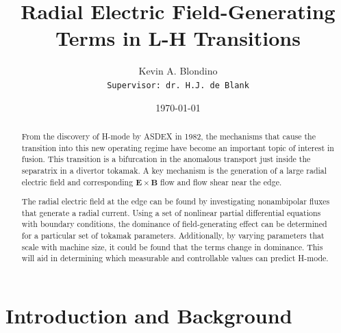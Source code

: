 \documentclass[a4paper]{article}
\author{Kevin A. Blondino \\
	\texttt{Supervisor: dr. H.J. de Blank}}
\title{Radial Electric Field-Generating Terms in L-H Transitions}
\date{\today}
\begin{document}
\maketitle


\begin{abstract}
	From the discovery of H-mode by ASDEX in 1982, the mechanisms that cause the transition into this new operating regime have become an important topic of interest in fusion.
	This transition is a bifurcation in the anomalous transport just inside the separatrix in a divertor tokamak.
	A key mechanism is the generation of a large radial electric field and corresponding $\mathbf{E}\times\mathbf{B}$ flow and flow shear near the edge.

	 The radial electric field at the edge can be found by investigating nonambipolar fluxes that generate a radial current.
	Using a set of nonlinear partial differential equations with boundary conditions, the dominance of field-generating effect can be determined for a particular set of tokamak parameters.
	Additionally, by varying parameters that scale with machine size, it could be found that the terms change in dominance.
	This will aid in determining which measurable and controllable values can predict H-mode.
\end{abstract}

\section{Introduction and Background}
\end{document}

